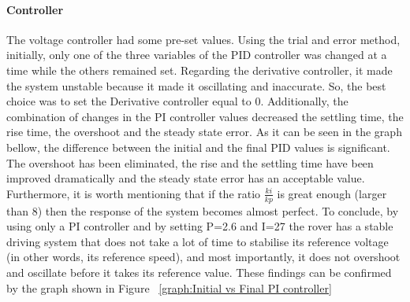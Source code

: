 \documentclass[a4paper]{article}
\begin{document}




\paragraph*{Controller}

The voltage controller had some pre-set values. Using the trial and error method, 
initially,  only one of the three variables of the PID controller was changed at 
a time while the others remained set. Regarding the derivative controller, it 
made the system unstable because it made it oscillating and inaccurate. So, 
the best choice was to set the Derivative controller equal to 0. Additionally, 
the combination of changes in the PI controller values decreased the settling 
time, the rise time, the overshoot and the steady state error. As it can be seen 
in the graph bellow, the difference between the initial and the final PID values 
is significant. The overshoot has been eliminated, the rise and the settling 
time have been improved dramatically and the steady state error has an acceptable 
value. Furthermore, it is worth mentioning that if the ratio  \( \frac{ki}{kp} \)  
is great enough (larger than 8) then the response of the system becomes almost 
perfect.
To conclude, by using only a PI controller and by setting P=2.6 and I=27 the 
rover has a stable driving system that does not take a lot of time to stabilise 
its reference voltage (in other words, its reference speed), and most importantly, 
it does not overshoot and oscillate before it takes its reference value. 
These findings can be confirmed by the graph shown in Figure ~\ref{graph:Initial vs Final PI controller}

\end{document}
